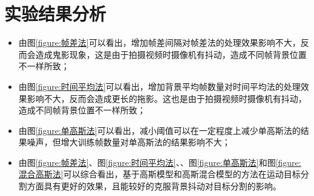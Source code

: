 \documentclass[a4paper]{ctexart}
\begin{document}
\section{实验结果分析}
\begin{itemize}
	\item 由图\ref{figure:帧差法}可以看出，增加帧差间隔对帧差法的处理效果影响不大，反而会造成鬼影现象，这是由于拍摄视频时摄像机有抖动，造成不同帧背景位置不一样所致；
	\item 由图\ref{figure:时间平均法}可以看出，增加背景平均帧数量对时间平均法的处理效果影响不大，反而会造成更长的拖影。这也是由于拍摄视频时摄像机有抖动，造成不同帧背景位置不一样所致；
	\item 由图\ref{figure:单高斯法}可以看出，减小阈值可以在一定程度上减少单高斯法的结果噪声，但增大训练帧数量对单高斯法的结果影响不大；
	\item 由图\ref{figure:帧差法}、图\ref{figure:时间平均法}、、图\ref{figure:单高斯法}和图\ref{figure:混合高斯法}可以综合看出，基于高斯模型和高斯混合模型的方法在运动目标分割方面具有更好的效果，且能较好的克服背景抖动对目标分割的影响。
\end{itemize}
\end{document}
